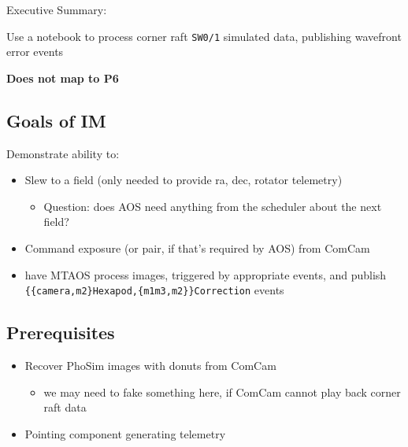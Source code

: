 Executive Summary:

Use a notebook to process corner raft \texttt{SW0/1} simulated data, publishing wavefront error events

\textbf{Does not map to P6}

\subsection{Goals of IM}

Demonstrate ability to:
\begin{itemize}
\item Slew to a field (only needed to provide ra, dec, rotator telemetry)
  \begin{itemize}
  \item Question: does AOS need anything from the scheduler about the next field?
  \end{itemize}
\item Command exposure (or pair, if that's required by \gls{AOS}) from ComCam
\item have MTAOS process images, triggered by appropriate events, and publish
  \texttt{\{\{camera,m2\}Hexapod,\{m1m3,m2\}\}Correction} events
\end{itemize}

\subsection{Prerequisites}
\begin{itemize}
\item Recover PhoSim images with donuts from ComCam
  \begin{itemize}
  \item we may need to fake something here, if ComCam cannot play back corner raft data
  \end{itemize}
\item Pointing component generating telemetry
\end{itemize}
